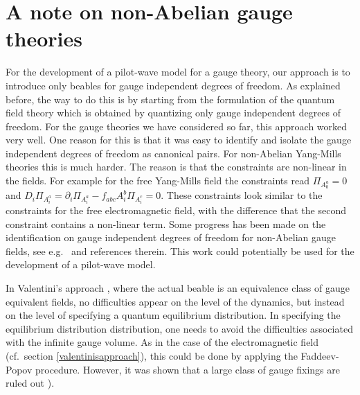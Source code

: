 \documentclass[12pt]{article}
\def\pa{\partial}
\begin{document}
\section{A note on non-Abelian gauge theories}\label{nonabeliangaugetheories}
For the development of a pilot-wave model for a gauge theory, our approach is to introduce only beables for gauge independent degrees of freedom. As explained before, the way to do this is by starting from the formulation of the quantum field theory which is obtained by quantizing only gauge independent degrees of freedom. For the gauge theories we have considered so far, this approach worked very well. One reason for this is that it was easy to identify and isolate the gauge independent degrees of freedom as canonical pairs. For non-Abelian Yang-Mills theories this is much harder. The reason is that the constraints are non-linear in the fields. For example for the free Yang-Mills field the constraints read $\Pi_{A^a_0} =0$ and $D_i \Pi_{A^a_i}= \pa_i \Pi_{A^a_i} - f_{abc} A^b_i\Pi_{A^c_i}=0$. These constraints look similar to the constraints for the free electromagnetic field, with the difference that the second constraint contains a non-linear term. Some progress has been made on the identification on gauge independent degrees of freedom for non-Abelian gauge fields, see e.g.\ \cite{karabali96} and references therein. This work could potentially be used for the development of a pilot-wave model.

In Valentini's approach \cite{valentini09}, where the actual beable is an equivalence class of gauge equivalent fields, no difficulties appear on the level of the dynamics, but instead on the level of specifying a quantum equilibrium distribution. In specifying the equilibrium distribution distribution, one needs to avoid the difficulties associated with the infinite gauge volume. As in the case of the electromagnetic field (cf.\ section \ref{valentinisapproach}), this could be done by applying the Faddeev-Popov procedure. However, it was shown that a large class of gauge fixings are ruled out \cite{singer78,chodos80}).







\end{document}
